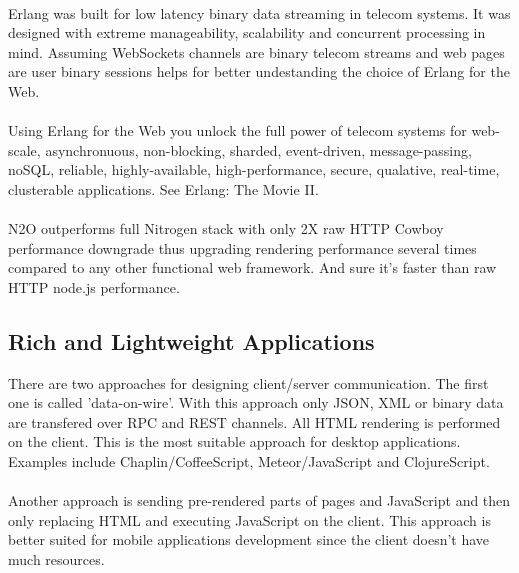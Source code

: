
\paragraph{}
Erlang was built for low latency binary data streaming in telecom systems.
It was designed with extreme manageability, scalability
and concurrent processing in mind. Assuming WebSockets channels are binary
telecom streams and web pages are user binary sessions
helps for better undestanding the choice of Erlang for the Web.

\paragraph{}
Using Erlang for the Web you unlock the full power of telecom systems for
web-scale, asynchronuous, non-blocking, sharded, event-driven,
message-passing, noSQL, reliable, highly-available, high-performance,
secure, qualative, real-time, clusterable applications. See Erlang: The Movie II.

\paragraph{}
N2O outperforms full Nitrogen stack with only 2X raw HTTP Cowboy
performance downgrade thus upgrading rendering performance several
times compared to any other functional web framework. And
sure it's faster than raw HTTP node.js performance.

\subsection{Rich and Lightweight Applications}
There are two approaches for designing client/server communication.
The first one is called 'data-on-wire'. With this approach only JSON, XML or binary
data are transfered over RPC and REST channels. All HTML rendering
is performed on the client. This is the most suitable approach for desktop
applications. Examples include Chaplin/CoffeeScript, Meteor/JavaScript
and ClojureScript.

\paragraph{}
Another approach is sending pre-rendered parts of pages and JavaScript
and then only replacing HTML and executing JavaScript on the client. This approach
is better suited for mobile applications development since the client doesn't have much resources.

